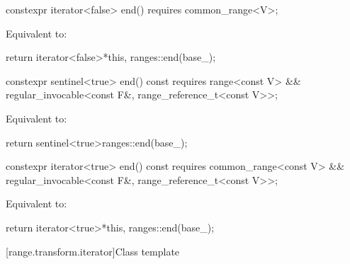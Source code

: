 %
\begin{itemdecl}
constexpr iterator<false> end() requires common_range<V>;
\end{itemdecl}

\begin{itemdescr}
\pnum
\effects
Equivalent to:
\begin{codeblock}
return iterator<false>{*this, ranges::end(base_)};
\end{codeblock}
\end{itemdescr}

%
\begin{itemdecl}
constexpr sentinel<true> end() const
  requires range<const V> &&
           regular_invocable<const F&, range_reference_t<const V>>;
\end{itemdecl}

\begin{itemdescr}
\pnum
\effects
Equivalent to:
\begin{codeblock}
return sentinel<true>{ranges::end(base_)};
\end{codeblock}
\end{itemdescr}

%
\begin{itemdecl}
constexpr iterator<true> end() const
  requires common_range<const V> &&
           regular_invocable<const F&, range_reference_t<const V>>;
\end{itemdecl}

\begin{itemdescr}
\pnum
\effects
Equivalent to:
\begin{codeblock}
return iterator<true>{*this, ranges::end(base_)};
\end{codeblock}
\end{itemdescr}

[range.transform.iterator]{Class template }

